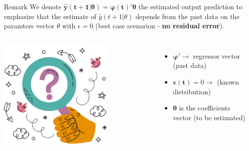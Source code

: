 \documentclass[aspectratio=169,hyperref={pdfpagelabels=false}]{beamer}
\begin{document}
\begin{frame}{}
  \begin{block}{Remark}
    We denote $\bm{\hat{y}(t+1|\theta) = \varphi(t)'\theta}$ the estimated output prediction
  to emphasize that the estimate of $\hat{y}(t+1|\theta)$ depends from the past data on the paramters vector $\theta$ with $\epsilon=0$ (best case scenarion - \textbf{no residual error}).
  \end{block}
  
  \vspace{2em}  
  \begin{columns}
     \includegraphics[width=0.7\textwidth]{img/pic5.png} \centering
    \begin{itemize}
      \item $\bm{\varphi}' \rightarrow$ regressor vector (past data)
      \item $\bm{\epsilon(t)} = 0 \rightarrow $ (known distribution)
      \item {$\bm{\theta}$ is the coefficients vector (to be estimated)}
    \end{itemize}
    \end{columns}
\end{frame}
\end{document}
